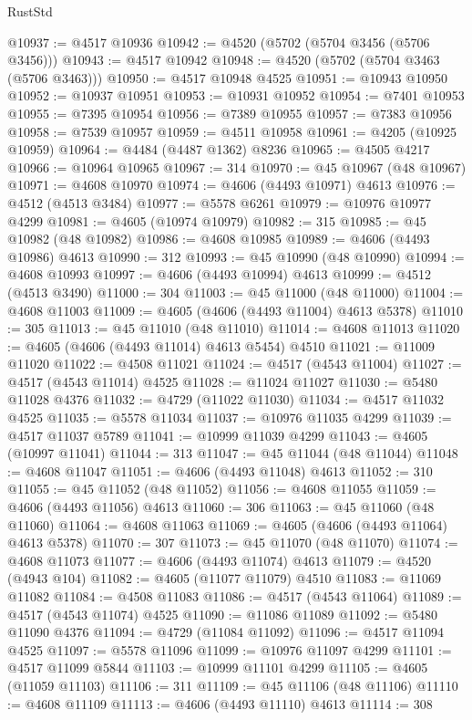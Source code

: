 \begin{lexlean}{RustStd}
\begin{coremodule}
@10937 := @4517 @10936
@10942 := @4520 (@5702 (@5704 @3456 (@5706 @3456)))
@10943 := @4517 @10942
@10948 := @4520 (@5702 (@5704 @3463 (@5706 @3463)))
@10950 := @4517 @10948 @4525
@10951 := @10943 @10950
@10952 := @10937 @10951
@10953 := @10931 @10952
@10954 := @7401 @10953
@10955 := @7395 @10954
@10956 := @7389 @10955
@10957 := @7383 @10956
@10958 := @7539 @10957
@10959 := @4511 @10958
@10961 := @4205 (@10925 @10959)
@10964 := @4484 (@4487 @1362) @8236
@10965 := @4505 @4217
@10966 := @10964 @10965
@10967 := 314
@10970 := @45 @10967 (@48 @10967)
@10971 := @4608 @10970
@10974 := @4606 (@4493 @10971) @4613
@10976 := @4512 (@4513 @3484)
@10977 := @5578 @6261
@10979 := @10976 @10977 @4299
@10981 := @4605 (@10974 @10979)
@10982 := 315
@10985 := @45 @10982 (@48 @10982)
@10986 := @4608 @10985
@10989 := @4606 (@4493 @10986) @4613
@10990 := 312
@10993 := @45 @10990 (@48 @10990)
@10994 := @4608 @10993
@10997 := @4606 (@4493 @10994) @4613
@10999 := @4512 (@4513 @3490)
@11000 := 304
@11003 := @45 @11000 (@48 @11000)
@11004 := @4608 @11003
@11009 := @4605 (@4606 (@4493 @11004) @4613 @5378)
@11010 := 305
@11013 := @45 @11010 (@48 @11010)
@11014 := @4608 @11013
@11020 := @4605 (@4606 (@4493 @11014) @4613 @5454) @4510
@11021 := @11009 @11020
@11022 := @4508 @11021
@11024 := @4517 (@4543 @11004)
@11027 := @4517 (@4543 @11014) @4525
@11028 := @11024 @11027
@11030 := @5480 @11028 @4376
@11032 := @4729 (@11022 @11030)
@11034 := @4517 @11032 @4525
@11035 := @5578 @11034
@11037 := @10976 @11035 @4299
@11039 := @4517 @11037 @5789
@11041 := @10999 @11039 @4299
@11043 := @4605 (@10997 @11041)
@11044 := 313
@11047 := @45 @11044 (@48 @11044)
@11048 := @4608 @11047
@11051 := @4606 (@4493 @11048) @4613
@11052 := 310
@11055 := @45 @11052 (@48 @11052)
@11056 := @4608 @11055
@11059 := @4606 (@4493 @11056) @4613
@11060 := 306
@11063 := @45 @11060 (@48 @11060)
@11064 := @4608 @11063
@11069 := @4605 (@4606 (@4493 @11064) @4613 @5378)
@11070 := 307
@11073 := @45 @11070 (@48 @11070)
@11074 := @4608 @11073
@11077 := @4606 (@4493 @11074) @4613
@11079 := @4520 (@4943 @104)
@11082 := @4605 (@11077 @11079) @4510
@11083 := @11069 @11082
@11084 := @4508 @11083
@11086 := @4517 (@4543 @11064)
@11089 := @4517 (@4543 @11074) @4525
@11090 := @11086 @11089
@11092 := @5480 @11090 @4376
@11094 := @4729 (@11084 @11092)
@11096 := @4517 @11094 @4525
@11097 := @5578 @11096
@11099 := @10976 @11097 @4299
@11101 := @4517 @11099 @5844
@11103 := @10999 @11101 @4299
@11105 := @4605 (@11059 @11103)
@11106 := 311
@11109 := @45 @11106 (@48 @11106)
@11110 := @4608 @11109
@11113 := @4606 (@4493 @11110) @4613
@11114 := 308

\end{coremodule}
\end{lexlean}
